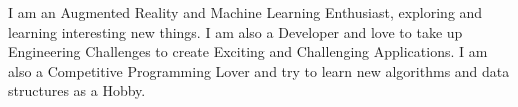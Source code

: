 


\begin{cvparagraph}

I am an Augmented Reality and Machine Learning Enthusiast, exploring and learning interesting new things.
I am also a Developer and love to take up Engineering Challenges to create Exciting and Challenging Applications.
I am also a Competitive Programming Lover and try to learn new algorithms and data structures as a Hobby.

\end{cvparagraph}
